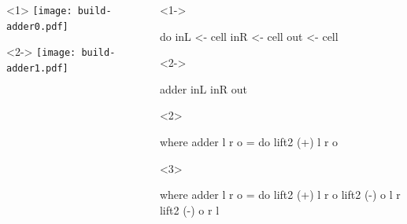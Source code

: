 \documentclass[UKenglish,usenames,dvipsnames,svgnames,table,aspectratio=169,mathserif]{beamer}
\newcommand{\nl}{\vspace{\baselineskip}}
\begin{document}
\begin{frame}[fragile]
\centering

\begin{columns}
\begin{column}{0.5\textwidth}
\nl
\begin{overlayarea}{0.5\textwidth}{0.4\textheight}
\begin{onlyenv}<1>
\texttt{[image: build-adder0.pdf]}
\end{onlyenv}
\begin{onlyenv}<2->
\texttt{[image: build-adder1.pdf]}
\end{onlyenv}
\end{overlayarea}
\end{column}

\begin{column}{0.5\textwidth}
\begin{overlayarea}{0.5\textwidth}{0.3\textheight}
\begin{onlyenv}<1->
\begin{haskellcode}
do
  inL  <- cell
  inR  <- cell
  out  <- cell
\end{haskellcode}
\end{onlyenv}
\nl
\begin{onlyenv}<2->
\begin{haskellcode}
  adder inL inR out
\end{haskellcode}
\end{onlyenv}
\end{overlayarea}

\begin{overlayarea}{0.5\textwidth}{0.3\textheight}
\begin{onlyenv}<2>
\begin{haskellcode}
    where
      adder l r o = do
        lift2 (+) l r o
\end{haskellcode}
\end{onlyenv}
\begin{onlyenv}<3>
\begin{haskellcode}
    where
      adder l r o = do
        lift2 (+) l r o
        lift2 (-) o l r
        lift2 (-) o r l
\end{haskellcode}
\end{onlyenv}
\end{overlayarea}
\end{column}

\end{columns}
\end{frame}
\end{document}
